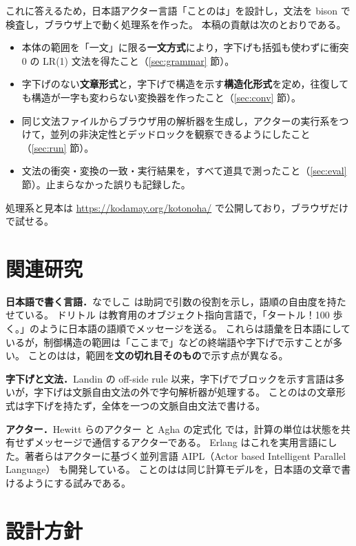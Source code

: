 \documentclass[a4paper,10pt]{ltjsarticle}
\begin{document}
これに答えるため，日本語アクター言語「ことのは」を設計し，文法を bison \cite{bison} で検査し，ブラウザ上で動く処理系を作った。
本稿の貢献は次のとおりである。
\begin{itemize}
\item 本体の範囲を「一文」に限る\textbf{一文方式}により，字下げも括弧も使わずに衝突 0 の LR(1) \cite{knuth65} 文法を得たこと（\ref{sec:grammar} 節）。
\item 字下げのない\textbf{文章形式}と，字下げで構造を示す\textbf{構造化形式}を定め，往復しても構造が一字も変わらない変換器を作ったこと（\ref{sec:conv} 節）。
\item 同じ文法ファイルからブラウザ用の解析器を生成し，アクターの実行系をつけて，並列の非決定性とデッドロックを観察できるようにしたこと（\ref{sec:run} 節）。
\item 文法の衝突・変換の一致・実行結果を，すべて道具で測ったこと（\ref{sec:eval} 節）。止まらなかった誤りも記録した。
\end{itemize}
処理系と見本は \url{https://kodamay.org/kotonoha/} で公開しており，ブラウザだけで試せる。

\section{関連研究}

\textbf{日本語で書く言語．}なでしこ \cite{nadesiko} は助詞で引数の役割を示し，語順の自由度を持たせている。
ドリトル \cite{dolittle} は教育用のオブジェクト指向言語で，「タートル！100 歩く。」のように日本語の語順でメッセージを送る。
これらは語彙を日本語にしているが，制御構造の範囲は「ここまで」などの終端語や字下げで示すことが多い。
ことのはは，範囲を\textbf{文の切れ目そのもの}で示す点が異なる。

\textbf{字下げと文法．}Landin の off-side rule \cite{landin66} 以来，字下げでブロックを示す言語は多いが，字下げは文脈自由文法の外で字句解析器が処理する。
ことのはの文章形式は字下げを持たず，全体を一つの文脈自由文法で書ける。

\textbf{アクター．}Hewitt らのアクター \cite{hewitt73} と Agha の定式化 \cite{agha86} では，計算の単位は状態を共有せずメッセージで通信するアクターである。
Erlang \cite{erlang} はこれを実用言語にした。著者らはアクターに基づく並列言語 AIPL（Actor based Intelligent Parallel Language）\cite{aipl} も開発している。
ことのはは同じ計算モデルを，日本語の文章で書けるようにする試みである。

\section{設計方針}
\end{document}
